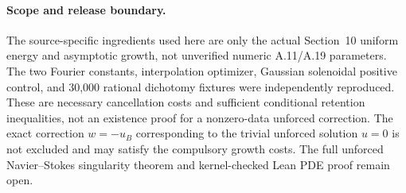 \paragraph{Scope and release boundary.}
The source-specific ingredients used here are only the
actual Section~10 uniform energy and asymptotic growth,
not unverified numeric A.11/A.19 parameters.
The two Fourier constants, interpolation optimizer,
Gaussian solenoidal positive control, and 30,000 rational
dichotomy fixtures were independently reproduced.
These are necessary cancellation costs and sufficient
conditional retention inequalities, not an existence
proof for a nonzero-data unforced correction.
The exact correction $w=-u_B$ corresponding to the
trivial unforced solution $u=0$ is not excluded and
may satisfy the compulsory growth costs.
The full unforced Navier--Stokes singularity theorem
and kernel-checked Lean PDE proof remain open.
